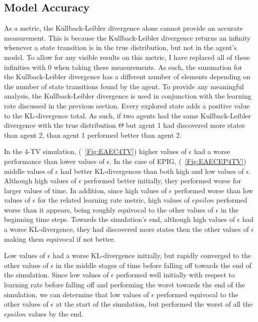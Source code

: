 \documentclass[12pt]{thesis}
\begin{document}
\subsection{Model Accuracy}
As a metric, the Kullback-Leibler divergence alone cannot provide an accurate measurement. This is because the Kullback-Leibler divergence returns an infinity whenever a state transition is in the true distribution, but not in the agent's model. To allow for any visible results on this metric, I have replaced all of these infinities with 0 when taking these measurements. As such, the summation for the Kullback-Leibler divergence has a different number of elements depending on the number of state transitions found by the agent. To provide any meaningful analysis, the Kullback-Leibler divergence is used in conjunction with the learning rate discussed in the previous section. Every explored state adds a positive value to the KL-divergence total. As such, if two agents had the same Kullback-Leibler divergence with the true distribution $\Theta$ but agent 1 had discovered more states than agent 2, than agent 1 performed better than agent 2.

In the 4-TV simulation, (\figurename~\ref{Fig:EAEC4TV}) higher values of $\epsilon$ had a worse performance than lower values of $\epsilon$. In the case of EPIG, (\figurename~\ref{Fig:EAECEP4TV}) middle values of $\epsilon$ had better KL-divergences than both high and low values of $\epsilon$. Although high values of $\epsilon$ performed better initially, they performed worse for larger values of time. In addition, since high values of $\epsilon$ performed worse than low values of $\epsilon$ for the related learning rate metric, high values of $epsilon$ performed worse than it appears, being roughly equivocal to the other values of $\epsilon$ in the beginning time steps. Towards the simulation's end, although high values of $\epsilon$ had a worse KL-divergence, they had discovered more states then the other values of $\epsilon$ making them equivocal if not better. 

Low values of $\epsilon$ had a worse KL-divergence initially, but rapidly converged to the other values of $\epsilon$ in the middle stages of time before falling off towards the end of the simulation. Since low values of $\epsilon$ performed well initially with respect to learning rate before falling off and performing the worst towards the end of the simulation, we can determine that low values of $\epsilon$ performed equivocal to the other values of $\epsilon$ at the start of the simulation, but performed the worst of all the $epsilon$ values by the end.
\end{document}
